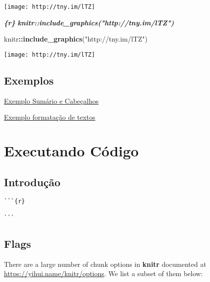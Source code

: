 \documentclass[
]{book}
\newenvironment{Shaded}{\begin{snugshade}}{\end{snugshade}}
\newcommand{\InformationTok}[1]{\textcolor[rgb]{0.56,0.35,0.01}{\textbf{\textit{#1}}}}
\newcommand{\KeywordTok}[1]{\textcolor[rgb]{0.13,0.29,0.53}{\textbf{#1}}}
\newcommand{\NormalTok}[1]{#1}
\newcommand{\OperatorTok}[1]{\textcolor[rgb]{0.81,0.36,0.00}{\textbf{#1}}}
\newcommand{\StringTok}[1]{\textcolor[rgb]{0.31,0.60,0.02}{#1}}
\begin{document}
\texttt{[image: http://tny.im/lTZ]}

\begin{Shaded}
\begin{Highlighting}[]
\InformationTok{\textasciigrave{}\textasciigrave{}\textasciigrave{}\{r\}}
\InformationTok{knitr::include\_graphics("http://tny.im/lTZ")}
\InformationTok{\textasciigrave{}\textasciigrave{}\textasciigrave{}}
\end{Highlighting}
\end{Shaded}

\begin{Shaded}
\begin{Highlighting}[]
\NormalTok{knitr}\OperatorTok{::}\KeywordTok{include\_graphics}\NormalTok{(}\StringTok{"http://tny.im/lTZ"}\NormalTok{)}
\end{Highlighting}
\end{Shaded}

\texttt{[image: http://tny.im/lTZ]}

\hypertarget{exemplos}{%
\section{Exemplos}\label{exemplos}}

\href{exemplos/102-sumario_e_cabecalho.html}{Exemplo Sumário e Cabeçalhos}

\href{exemplos/103-formatacao_de_texto.html}{Exemplo formatação de textos}

\hypertarget{executando-cuxf3digo}{%
\chapter{Executando Código}\label{executando-cuxf3digo}}

\hypertarget{introduuxe7uxe3o}{%
\section{Introdução}\label{introduuxe7uxe3o}}

\begin{verbatim}
```{r}

```
\end{verbatim}

\hypertarget{flags}{%
\section{Flags}\label{flags}}

There are a large number of chunk options in \textbf{knitr} documented at \url{https://yihui.name/knitr/options}. We list a subset of them below:
\end{document}
